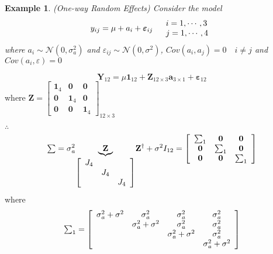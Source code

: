 \documentclass{article}
\newtheorem{example}[theorem]{Example}
\begin{document}
\bigskip

\begin{example}
(One-way Random Effects) Consider the model%
\begin{equation*}
y_{ij}=\mu +a_{i}+\mathbf{\varepsilon }_{ij}\quad 
\begin{tabular}{l}
$i=1,\cdots ,3$ \\ 
$j=1,\cdots ,4$%
\end{tabular}%
\end{equation*}%
where $a_{i}\sim \mathcal{N}\left( 0,\sigma _{a}^{2}\right) $ and $%
\varepsilon _{ij}\sim \mathcal{N}\left( 0,\sigma ^{2}\right) $, $Cov\left(
a_{i},a_{j}\right) =0\quad i\neq j$ and $Cov\left( a_{i},\varepsilon \right)
=0$
\end{example}

\bigskip 

\begin{equation*}
\mathbf{Y}_{12}=\mu \mathbf{1}_{12}+\mathbf{Z}_{12\times 3}\mathbf{a}%
_{3\times 1}+\mathbf{\varepsilon }_{12}
\end{equation*}%
where $\mathbf{Z}=\left[ 
\begin{array}{ccc}
\boldsymbol{1}_{4} & \boldsymbol{0} & \boldsymbol{0} \\ 
\boldsymbol{0} & \boldsymbol{1}_{4} & \boldsymbol{0} \\ 
\boldsymbol{0} & \boldsymbol{0} & \boldsymbol{1}_{4}%
\end{array}%
\right] _{12\times 3}$

\bigskip 

$\therefore $%
\begin{equation*}
\tsum =\sigma _{a}^{2}\underset{\left[ 
\begin{array}{ccc}
J_{4} &  &  \\ 
& J_{4} &  \\ 
&  & J_{4}%
\end{array}%
\right] }{\underbrace{\mathbf{Z}}}\mathbf{Z}^{\dagger }+\sigma ^{2}I_{12}=%
\left[ 
\begin{array}{ccc}
\tsum_{1} & \boldsymbol{0} & \boldsymbol{0} \\ 
\boldsymbol{0} & \tsum_{1} & \boldsymbol{0} \\ 
\boldsymbol{0} & \boldsymbol{0} & \tsum_{1}%
\end{array}%
\right] 
\end{equation*}%
where%
\begin{equation*}
\tsum\nolimits_{1}=\left[ 
\begin{array}{cccc}
\sigma _{a}^{2}+\sigma ^{2} & \sigma _{a}^{2} & \sigma _{a}^{2} & \sigma
_{a}^{2} \\ 
& \sigma _{a}^{2}+\sigma ^{2} & \sigma _{a}^{2} & \sigma _{a}^{2} \\ 
&  & \sigma _{a}^{2}+\sigma ^{2} & \sigma _{a}^{2} \\ 
&  &  & \sigma _{a}^{2}+\sigma ^{2}%
\end{array}%
\right] 
\end{equation*}
\end{document}
